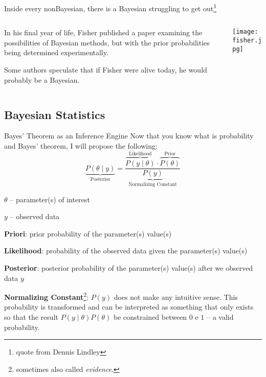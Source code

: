 \begin{frame}{Inside every nonBayesian, there is a Bayesian struggling to get out\footnote{
			quote from Dennis Lindley}}
	\begin{columns}
		\begin{column}{0.8\textwidth}
			\begin{vfilleditems}
				\item In his final year of life,
				Fisher published a paper \parencite{fisherExamplesBayesMethod1962}
				examining the possibilities of Bayesian methods,
				but with the prior probabilities being determined experimentally.
				\item Some authors speculate \parencite{jaynesProbabilityTheoryLogic2003}
				that if Fisher were alive today, he would probably be a Bayesian.
			\end{vfilleditems}
		\end{column}
		\begin{column}{0.2\textwidth}
			\centering
			\texttt{[image: fisher.jpg]}
		\end{column}
	\end{columns}
\end{frame}

\subsection{Bayesian Statistics}
\begin{frame}{Bayes' Theorem as an Inference Engine}
	\footnotesize Now that you know what is probability and Bayes' theorem,
	I will propose the following:
	$$
		\underbrace{P(\theta \mid y)}_{\text{Posterior}} = \frac{\overbrace{P(y \mid  \theta)}^{\text{Likelihood}} \cdot \overbrace{P(\theta)}^{\text{Prior}}}{\underbrace{P(y)}_{\text{Normalizing Constant}}}
	$$
	\begin{vfilleditems}
		\item \footnotesize $\theta$ -- parameter(s) of interest
		\item \footnotesize $y$ -- observed data
		\item \footnotesize \textbf{Priori}: prior probability of the parameter(s) value(s)
		\item \footnotesize \textbf{Likelihood}: probability of the observed data given the parameter(s) value(s)
		\item \footnotesize \textbf{Posterior}: posterior probability of the parameter(s) value(s) after we observed data $y$
		\item \footnotesize \textbf{Normalizing Constant}\footnote{sometimes also called \textit{evidence}.}: $P(y)$ does not make any intuitive sense.
		This probability is transformed and can be interpreted as something that only exists so that the result $P(y \mid \theta) P(\theta)$ be constrained between $0$ e $1$
		-- a valid probability.
	\end{vfilleditems}
\end{frame}

